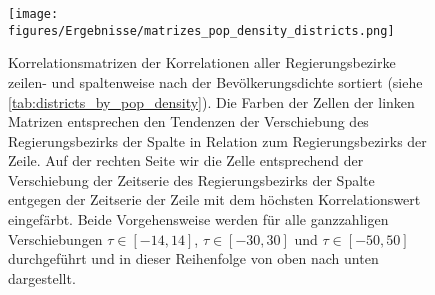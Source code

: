 \begin{figure}[H]
    \centering
    \texttt{[image: figures/Ergebnisse/matrizes\_pop\_density\_districts.png]}
    \caption{Korrelationsmatrizen der Korrelationen aller Regierungsbezirke zeilen- und spaltenweise nach der Bevölkerungsdichte sortiert (siehe \autoref{tab:districts_by_pop_density}). Die Farben der Zellen der linken Matrizen entsprechen den Tendenzen der Verschiebung des Regierungsbezirks der Spalte in Relation zum Regierungsbezirks der Zeile.
    Auf der rechten Seite wir die Zelle entsprechend der Verschiebung der Zeitserie des Regierungsbezirks der Spalte entgegen der Zeitserie der Zeile mit dem höchsten Korrelationswert eingefärbt. Beide Vorgehensweise werden für alle ganzzahligen Verschiebungen $\tau\in[-14,14]$,  $\tau\in[-30,30]$ und  $\tau\in[-50,50]$ durchgeführt und in dieser Reihenfolge von oben nach unten dargestellt.}
    \label{fig:matrizes_pop_density_districts}
\end{figure}

